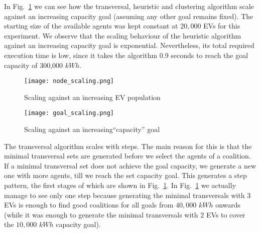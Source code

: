 In Fig.~\ref{fig:goalscale} %
we can see how the transversal, heuristic and clustering algorithm scale against an increasing capacity goal (assuming any other goal remains fixed). The starting size of the available agents was kept constant at $20,000$ EVs for this experiment. We observe that the scaling behaviour of the heuristic algorithm against an increasing capacity goal is exponential. %
Nevertheless, its total required execution time is low, since it takes the algorithm 0.9 seconds to reach the goal capacity of 300,000 $kWh$.
\begin{figure}
	\centering
	\begin{minipage}{.5\textwidth}
		\centering
		\texttt{[image: node\_scaling.png]}
		\caption{Scaling against an increasing
			\newline EV population\label{fig:popscale}}
	\end{minipage}%
	\begin{minipage}{.5\textwidth}
		\texttt{[image: goal\_scaling.png]}
		\caption{Scaling against an increasing\newline ``capacity'' goal\label{fig:goalscale}}
	\end{minipage}
\end{figure}
\vspace{-10pt}
The transversal algorithm scales with steps. The main reason for this is that the minimal transversal sets are generated before we select the agents of a coalition. If a minimal transversal set does not achieve the goal capacity, we generate a new one with more agents, till we reach the set capacity goal. This generates a step pattern, the first stages of which are shown in Fig.~\ref{fig:goalscale}. In Fig.~\ref{fig:goalscale} we actually manage to see only one step because generating the minimal transversals with $3$ EVs is enough to find good coalitions for all goals from $40,000$ $kWh$ onwards (while it was enough to generate the minimal transversals with $2$ EVs to cover the $10,000$ $kWh$ capacity goal). %

